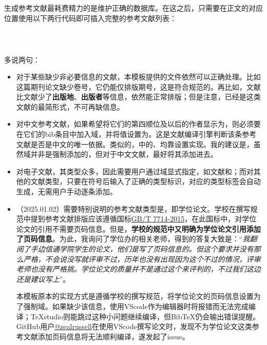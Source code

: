 \documentclass[print, doctor, vlined]{DissertUESTC}
\begin{document}
	生成参考文献最耗费精力的是维护正确的数据库。在这之后，只需要在正文的对应位置使用以下两行代码即可插入完整的参考文献列表：
	\begin{verbatim}
		
		
	\end{verbatim}
	
	多说两句：
	\begin{itemize}
		\item 对于某些缺少非必要信息的文献，本模板提供的文件依然可以正确处理。比如\cite{王晓琰2019关于连续出版会议论文著录格式的探讨}这篇期刊论文缺少卷号，它仍能仅排版期号，这是符合规范的。再比如，文献\cite{电子文献2}比文献\cite{电子文献1}少了\textbf{出版地}、\textbf{出版者}等信息，依然能正常排版；但是注意，\cite{电子文献2}已经是这类文献的最简形式，不可再缺信息。
		
		\item 对中文参考文献，如果希望将它们的第四顺位及以后的作者显示为，则必须要在它们的bib条目中加入域，并将值设置为。这是文献编译引擎判断该条参考文献是否是中文的唯一依据。类似的，\cite{罗杰斯2011}中的、均靠设置实现。我的建议是，虽然域并非是强制添加的，但对于中文文献，最好将其添加进去。
		
		\item 对电子文献，其类型众多，因此需要用户通过域显式指定，如文献\cite{电子文献1}和\cite{电子文献2}；而对其他的文献类型，只要在符号后输入了正确的类型标识，对应的类型标签会自动生成，无需用户手动逐条添加。
		
		\item （2025.01.02）需要特别说明的参考文献类型是，即学位论文。学校在撰写规范中提到参考文献排版应该遵循国标\href{https://lib.tsinghua.edu.cn/wj/GBT7714-2015.pdf}{\color{DarkRed}GB/T 7714-2015}，在此国标中，对学位论文的引用不需要页码信息。但是，\textbf{学校的规范中又明确为学位论文引用添加了页码信息}。为此，我询问了学位办的相关老师，得到的答复大致是：“\textit{我翻阅了手边信通学院学生的论文，他们是写了页码信息的。但这个要求并没有那么严格，不会说没写就评审不过，历年也没有出现因为这个不过的情况，评审老师也没有严格挑。学位论文的质量并不是通过这个来评判的，不过我们这边还是建议写上}”。
   
		本模板原本的实现方式是遵循学校的撰写规范，将学位论文的页码信息设置为了强制域。如果缺少该信息，使用VScode作为编辑器时将报错而无法完成编译；TeXstudio则能跳过这种小问题继续编译，但BibTeX仍会输出错误提醒。GitHub用户\href{https://github.com/zealrussell}{\color{DarkRed}@zealrussell}在使用VScode撰写论文时，发现不为学位论文这类参考文献添加页码信息将无法顺利编译，遂发起了issue。
		

\end{itemize}
\end{document}
